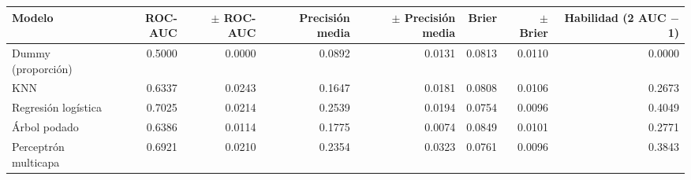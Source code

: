 \begin{tabular}{lrrrrrrr}
\toprule
Modelo & ROC-AUC & $\pm$ ROC-AUC & Precisión media & $\pm$ Precisión media & Brier & $\pm$ Brier & Habilidad (2 AUC $-$ 1) \\
\midrule
Dummy (proporción) & 0.5000 & 0.0000 & 0.0892 & 0.0131 & 0.0813 & 0.0110 & 0.0000 \\
KNN & 0.6337 & 0.0243 & 0.1647 & 0.0181 & 0.0808 & 0.0106 & 0.2673 \\
Regresión logística & 0.7025 & 0.0214 & 0.2539 & 0.0194 & 0.0754 & 0.0096 & 0.4049 \\
Árbol podado & 0.6386 & 0.0114 & 0.1775 & 0.0074 & 0.0849 & 0.0101 & 0.2771 \\
Perceptrón multicapa & 0.6921 & 0.0210 & 0.2354 & 0.0323 & 0.0761 & 0.0096 & 0.3843 \\
\bottomrule
\end{tabular}
